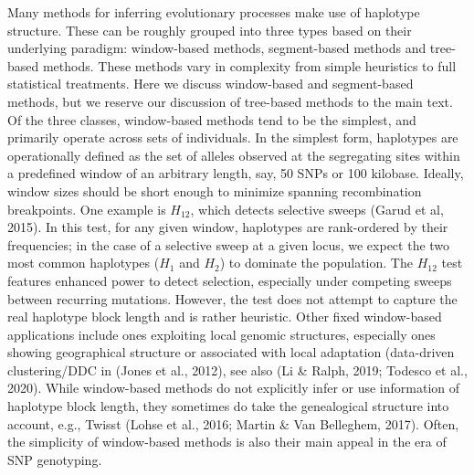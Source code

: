 \documentclass[twocolumn]{bmcart}%
\begin{document}
\begin{strip}
\begin{tcolorbox}[colback=blue!2!white,colframe=blue!50!black,title= Box 2: Population genetic methods that make use of haplotype information]
  \begin{multicols}{2}
\footnotesize{Many methods for inferring evolutionary processes make use of haplotype structure. These can be roughly grouped into three types based on their underlying paradigm: window-based methods, segment-based methods and tree-based methods. These methods vary in complexity from simple heuristics to full statistical treatments. Here we discuss window-based and segment-based methods, but we reserve our discussion of tree-based methods to the main text. \\

Of the three classes, window-based methods tend to be the simplest, and primarily operate across sets of individuals. In the simplest form, haplotypes are operationally defined as the set of alleles observed at the segregating sites within a predefined window of an arbitrary length, say, 50 SNPs or 100 kilobase. Ideally, window sizes should be short enough to minimize spanning recombination breakpoints. One example is $H_12$, which detects selective sweeps (Garud et al, 2015). In this test, for any given window, haplotypes are rank-ordered by their frequencies; in the case of a selective sweep at a given locus, we expect the two most common haplotypes ($H_1$ and $H_2$) to dominate the population. The $H_12$ test features enhanced power to detect selection, especially under competing sweeps between recurring mutations. However, the test does not attempt to capture the real haplotype block length and is rather heuristic. Other fixed window-based applications include ones exploiting local genomic structures, especially ones showing geographical structure or associated with local adaptation (data-driven clustering/DDC in (Jones et al., 2012), see also (Li \& Ralph, 2019; Todesco et al., 2020). While window-based methods do not explicitly infer or use information of haplotype block length, they sometimes do take the genealogical structure into account, e.g., Twisst (Lohse et al., 2016; Martin \& Van Belleghem, 2017). Often, the simplicity of window-based methods is also their main appeal in the era of SNP genotyping. \\

}
\end{multicols}
\end{tcolorbox}
\end{strip}
\end{document}
